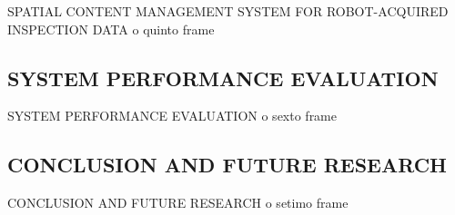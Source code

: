 \documentclass{beamer}
\begin{document}
            \begin{frame}{SPATIAL CONTENT MANAGEMENT SYSTEM FOR ROBOT-ACQUIRED INSPECTION DATA}
                o quinto frame            
            \end{frame}        

        \subsection{SYSTEM PERFORMANCE EVALUATION}

            \begin{frame}{SYSTEM PERFORMANCE EVALUATION}
                o sexto frame            
            \end{frame}
            
        \subsection{CONCLUSION AND FUTURE RESEARCH}

            \begin{frame}{CONCLUSION AND FUTURE RESEARCH}
                o setimo frame            
            \end{frame}
\end{document}
